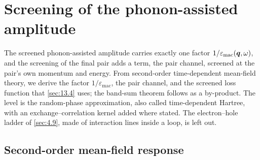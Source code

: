 \section{Screening of the phonon-assisted amplitude}\label{app:D.36}

The screened phonon-assisted amplitude carries exactly one factor $1/\varepsilon_{\mathrm{mac}}(\bm{q},\omega)$, and the screening of the final pair adds a term, the pair channel, screened at the pair's own momentum and energy. From second-order time-dependent mean-field theory, we derive the factor $1/\varepsilon_{\mathrm{mac}}$, the pair channel, and the screened loss function that \cref{sec:13.4} uses; the band-sum theorem follows as a by-product. The level is the random-phase approximation, also called time-dependent Hartree, with an exchange--correlation kernel added where stated. The electron--hole ladder of \cref{sec:4.9}, made of interaction lines inside a loop, is left out.

\subsection*{Second-order mean-field response}

